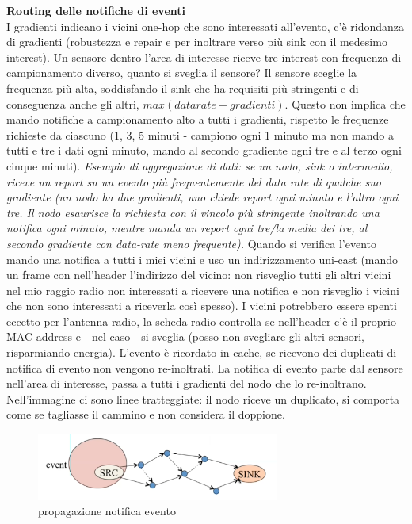 \documentclass[12pt,italian]{report}
\begin{document}
\noindent \textbf{Routing delle notifiche di eventi} \\
I gradienti indicano i vicini one-hop che sono interessati all'evento, c'è ridondanza di gradienti (robustezza e repair e per inoltrare verso più sink con il medesimo interest). 
\bigbreak
Un sensore dentro l'area di interesse riceve tre interest con frequenza di campionamento diverso, quanto si sveglia il sensore? Il sensore sceglie la frequenza più alta, soddisfando il sink che ha requisiti più stringenti e di conseguenza anche gli altri, $max(datarate-gradienti)$. Questo non implica che mando notifiche a campionamento alto a tutti i gradienti, rispetto le frequenze richieste da ciascuno (1, 3, 5 minuti - campiono ogni 1 minuto ma non mando a tutti e tre i dati ogni minuto, mando al secondo gradiente ogni tre e al terzo ogni cinque minuti).
\bigbreak
\textit{Esempio di aggregazione di dati: se un nodo, sink o intermedio, riceve un report su un evento più frequentemente del data rate di qualche suo gradiente (un nodo ha due gradienti, uno chiede report ogni minuto e l'altro ogni tre. Il nodo esaurisce la richiesta con il vincolo più stringente inoltrando una notifica ogni minuto, mentre manda un report ogni tre/la media dei tre, al secondo gradiente con data-rate meno frequente).}
\bigbreak
Quando si verifica l'evento mando una notifica a tutti i miei vicini e uso un indirizzamento uni-cast (mando un frame con nell'header l'indirizzo del vicino: non risveglio tutti gli altri vicini nel mio raggio radio non interessati a ricevere una notifica e non risveglio i vicini che non sono interessati a riceverla così spesso). I vicini potrebbero essere spenti eccetto per l'antenna radio, la scheda radio controlla se nell'header c'è il proprio MAC address e - nel caso - si sveglia (posso non svegliare gli altri sensori, risparmiando energia). 
\bigbreak
L'evento è ricordato in cache, se ricevono dei duplicati di notifica di evento non vengono re-inoltrati.
\bigbreak
La notifica di evento parte dal sensore nell'area di interesse, passa a tutti i gradienti del nodo che lo re-inoltrano. Nell'immagine ci sono linee tratteggiate: il nodo riceve un duplicato, si comporta come se tagliasse il cammino e non considera il doppione. 
\begin{figure}[h]
\centering
\includegraphics[width=80mm]{img/r5.PNG}
\caption{propagazione notifica evento}
\label{fig:evento}
\end{figure}
\end{document}
